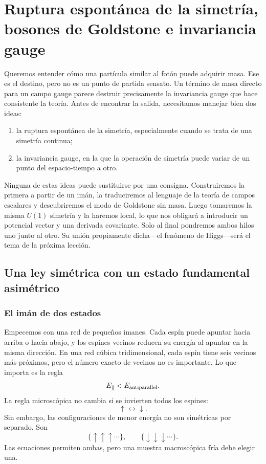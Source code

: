\chapter{Ruptura espontánea de la simetría, bosones de Goldstone e invariancia gauge}

Queremos entender cómo una partícula similar al fotón puede adquirir masa. Ese es el destino, pero no es un punto de partida sensato. Un término de masa directo para un campo gauge parece destruir precisamente la invariancia gauge que hace consistente la teoría. Antes de encontrar la salida, necesitamos manejar bien dos ideas:
\begin{enumerate}
  \item la ruptura espontánea de la simetría, especialmente cuando se trata de una simetría continua;
  \item la invariancia gauge, en la que la operación de simetría puede variar de un punto del espacio-tiempo a otro.
\end{enumerate}
Ninguna de estas ideas puede sustituirse por una consigna. Construiremos la primera a partir de un imán, la traduciremos al lenguaje de la teoría de campos escalares y descubriremos el modo de Goldstone sin masa. Luego tomaremos la misma \(U(1)\) simetría y la haremos local, lo que nos obligará a introducir un potencial vector y una derivada covariante. Solo al final pondremos ambos hilos uno junto al otro. Su unión propiamente dicha---el fenómeno de Higgs---será el tema de la próxima lección.

\section{Una ley simétrica con un estado fundamental asimétrico}

\subsection{El imán de dos estados}

Empecemos con una red de pequeños imanes. Cada espín puede apuntar hacia arriba o hacia abajo, y los espines vecinos reducen su energía al apuntar en la misma dirección. En una red cúbica tridimensional, cada espín tiene seis vecinos más próximos, pero el número exacto de vecinos no es importante. Lo que importa es la regla
\begin{equation}
  E_{\parallel}<E_{\rm antiparallel}.
\end{equation}
La regla microscópica no cambia si se invierten todos los espines:
\begin{equation}
  \uparrow\longleftrightarrow\downarrow.
\end{equation}
Sin embargo, las configuraciones de menor energía no son simétricas por separado. Son
\begin{equation}
  \{\uparrow\uparrow\uparrow\cdots\},
  \qquad
  \{\downarrow\downarrow\downarrow\cdots\}.
\end{equation}
Las ecuaciones permiten ambas, pero una muestra macroscópica fría debe elegir una.

